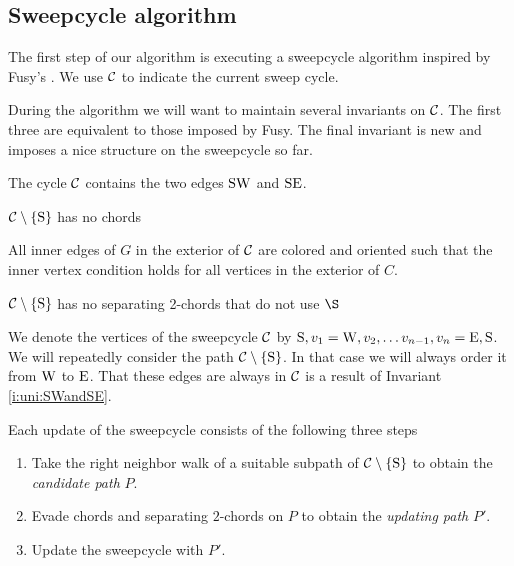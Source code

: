 
\subsection{Sweepcycle algorithm}
\thispagestyle{plain}
  \label{ss:sweep}
  The first step of our algorithm is executing a sweepcycle algorithm inspired by Fusy's \cite{Fusy2006}. We use $\mathcal{C}$ to indicate the current sweep cycle.





  During the algorithm we will want to maintain several invariants on $\mathcal{C}$. The first three are equivalent to those imposed by Fusy. The final invariant is new and imposes a nice structure on the sweepcycle so far. 

  \begin{invariants}
    \itemsep=-4pt

    \item \label{i:uni:SWandSE} The cycle $\mathcal{C}$ contains the two edges $\mathrm{S} \mathrm{W}$ and $\mathrm{S} \mathrm{E}$.
    \item \label{i:uni:noChords} $\mathcal{C} \setminus \left\lbrace {\mathrm{S}} \right\rbrace$ has no chords
    \item \label{i:uni:intVertCond} All inner edges of $G$ in the exterior of $\mathcal{C}$ are colored and oriented such that the inner vertex condition holds for all vertices in the exterior of $C$.
    \item \label{i:uni:no2Chords} $\mathcal{C}\setminus \left\lbrace {\mathrm{S}} \right\rbrace$ has no separating 2-chords that do not use $\S$
  \end{invariants}

  We denote the vertices of the sweepcycle $\mathcal{C}$ by $\mathrm{S}, v_1 = \mathrm{W}, v_2, \ldots v_{n-1}, v_n = \mathrm{E}, \mathrm{S}$.   We will repeatedly consider the path $\mathcal{C} \setminus \left\lbrace {\mathrm{S}} \right\rbrace$. In that case we will always order it from $\mathrm{W}$ to $\mathrm{E}$. That these edges are always in $\mathcal{C}$ is a result of Invariant \ref{i:uni:SWandSE}.


  Each update of the sweepcycle consists of the following three steps
  \begin{enumerate}
    \itemsep=-4pt
    \item Take the right neighbor walk of a suitable subpath of $\mathcal{C} \setminus \left\lbrace {\mathrm{S}} \right\rbrace$ to obtain the \emph{candidate path} $P$.
    \item Evade chords and separating $2$-chords on $P$ to obtain the \emph{updating path} $P'$.
    \item Update the sweepcycle with $P'$.
  \end{enumerate}

